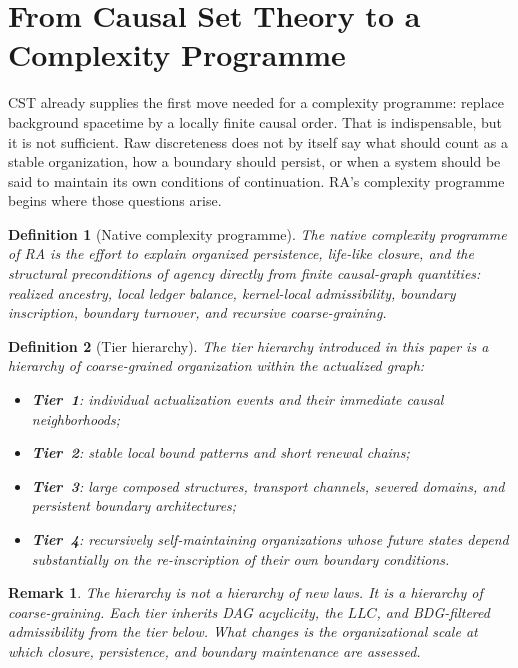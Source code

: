 \documentclass[11pt]{article}
\def\mathrm#1{#1}%
\newtheorem{definition}{Definition}
\newtheorem{remark}{Remark}
\newcommand{\LLC}{\ensuremath{\mathrm{LLC}}}
\begin{document}
\section{From Causal Set Theory to a Complexity Programme}

CST already supplies the first move needed for a complexity programme: replace background spacetime by a locally finite causal order. That is indispensable, but it is not sufficient. Raw discreteness does not by itself say what should count as a stable organization, how a boundary should persist, or when a system should be said to maintain its own conditions of continuation. RA's complexity programme begins where those questions arise.

\begin{definition}[Native complexity programme]
The \emph{native complexity programme} of RA is the effort to explain organized persistence, life-like closure, and the structural preconditions of agency directly from finite causal-graph quantities: realized ancestry, local ledger balance, kernel-local admissibility, boundary inscription, boundary turnover, and recursive coarse-graining.
\end{definition}

\begin{definition}[Tier hierarchy]
The tier hierarchy introduced in this paper is a hierarchy of coarse-grained organization within the actualized graph:
\begin{itemize}[nosep]
    \item \textbf{Tier~1}: individual actualization events and their immediate causal neighborhoods;
    \item \textbf{Tier~2}: stable local bound patterns and short renewal chains;
    \item \textbf{Tier~3}: large composed structures, transport channels, severed domains, and persistent boundary architectures;
    \item \textbf{Tier~4}: recursively self-maintaining organizations whose future states depend substantially on the re-inscription of their own boundary conditions.
\end{itemize}
\end{definition}

\begin{remark}
The hierarchy is not a hierarchy of new laws. It is a hierarchy of coarse-graining. Each tier inherits DAG acyclicity, the \LLC, and BDG-filtered admissibility from the tier below. What changes is the organizational scale at which closure, persistence, and boundary maintenance are assessed.
\end{remark}
\end{document}
